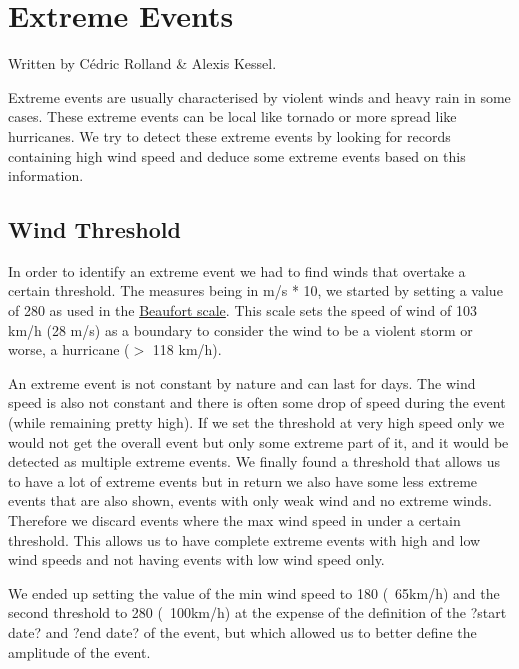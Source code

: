 \section{Extreme Events}
Written by Cédric Rolland \& Alexis Kessel.

Extreme events are usually characterised by violent winds and heavy rain in some cases. These extreme events can be local like tornado or more spread like hurricanes. We try to detect these extreme events by looking for records containing high wind speed and deduce some extreme events based on this information.

\subsection{Wind Threshold}
In order to identify an extreme event we had to find winds that overtake a certain threshold. The measures being in m/s * 10, we started by setting a value of 280 as used in the \href{http://en.wikipedia.org/wiki/Beaufort_scale}{Beaufort scale}. This scale sets the speed of wind of 103 km/h (28 m/s) as a boundary to consider the wind to be a violent storm or worse, a hurricane ($>$ 118 km/h).

An extreme event is not constant by nature and can last for days. The wind speed is also not constant and there is often some drop of speed during the event (while remaining pretty high). If we set the threshold at very high speed only we would not get the overall event but only some extreme part of it, and it would be detected as multiple extreme events. We finally found a threshold that allows us to have a lot of extreme events but in return we also have some less extreme events that are also shown, events with only weak wind and no extreme winds. Therefore we discard events where the max wind speed in under a certain threshold. This allows us to have complete extreme events with high and low wind speeds and not having events with low wind speed only.

We ended up setting the value of the min wind speed to 180 (~65km/h) and the second threshold to 280 (~100km/h) at the expense of the definition of the ?start date? and ?end date? of the event, but which allowed us to better define the amplitude of the event.


